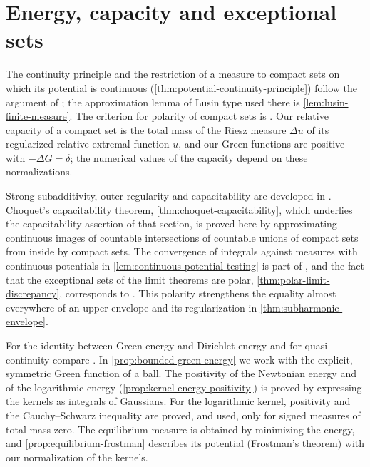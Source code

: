 \section{Energy, capacity and exceptional sets}
\label{sec:history-capacity}
The continuity principle and the restriction of a measure to compact sets on which its potential is continuous (\cref{thm:potential-continuity-principle}) follow the argument of \cite[Theorems 3.4.6--3.4.7]{Hor07}; the approximation lemma of Lusin type used there is \cref{lem:lusin-finite-measure}. The criterion for polarity of compact sets is \cite[Theorem 3.4.5]{Hor07}. Our relative capacity of a compact set is the total mass of the Riesz measure $\Delta u$ of its regularized relative extremal function $u$, and our Green functions are positive with $-\Delta G=\delta$; the numerical values of the capacity depend on these normalizations.

Strong subadditivity, outer regularity and capacitability are developed in \cite[Section 3.4, especially Theorems 3.4.9 and 3.4.12 and Proposition 3.4.13]{Hor07}. Choquet's capacitability theorem, \cref{thm:choquet-capacitability}, which underlies the capacitability assertion of that section, is proved here by approximating continuous images of countable intersections of countable unions of compact sets from inside by compact sets. The convergence of integrals against measures with continuous potentials in \cref{lem:continuous-potential-testing} is part of \cite[Theorem 3.2.13]{Hor07}, and the fact that the exceptional sets of the limit theorems are polar, \cref{thm:polar-limit-discrepancy}, corresponds to \cite[Theorem 3.4.14]{Hor07}. This polarity strengthens the equality almost everywhere of an upper envelope and its regularization in \cref{thm:subharmonic-envelope}.

For the identity between Green energy and Dirichlet energy and for quasi-continuity compare \cite[Propositions 3.4.19 and 3.4.21]{Hor07}. In \cref{prop:bounded-green-energy} we work with the explicit, symmetric Green function of a ball. The positivity of the Newtonian energy and of the logarithmic energy (\cref{prop:kernel-energy-positivity}) is proved by expressing the kernels as integrals of Gaussians. For the logarithmic kernel, positivity and the Cauchy--Schwarz inequality are proved, and used, only for signed measures of total mass zero. The equilibrium measure is obtained by minimizing the energy, and \cref{prop:equilibrium-frostman} describes its potential (Frostman's theorem) with our normalization of the kernels.

